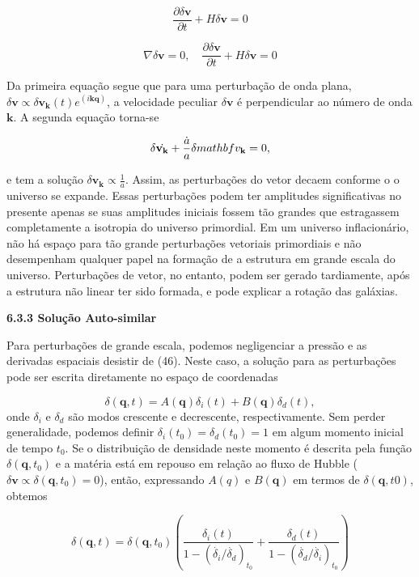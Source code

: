 \documentclass[a4paper,12pt]{article}
\begin{document}
$$\dfrac{\partial\delta\mathbf{v}}{\partial t} + H\delta\mathbf{v} = 0$$
\newline

\begin{equation}
	\nabla\delta\mathbf{v} = 0 , \quad \dfrac{\partial\delta\mathbf{v}}{\partial t } + H\delta\mathbf{v} = 0
\end{equation}

Da primeira equação segue que para uma perturbação de onda plana, $\delta\mathbf{v} \propto \delta\mathbf{v}_\mathbf{k} (t)e^{(i\mathbf{kq})}$, a velocidade peculiar $\delta\mathbf{v}$ é perpendicular ao número de onda $\mathbf{k}$. A segunda equação torna-se

\begin{equation}
	\delta\dot{\mathbf{v}_\mathbf{k}} + \dfrac{\dot{a}}{a}\delta\\mathbf{v}_\mathbf{k}=0,
\end{equation}

e tem a solução $\delta\mathbf{v_k} \propto \frac{1}{a}$. Assim, as perturbações do vetor decaem conforme o
o universo se expande. Essas perturbações podem ter amplitudes significativas no presente
apenas se suas amplitudes iniciais fossem tão grandes que estragassem completamente a isotropia do universo primordial. Em um universo inflacionário, não há espaço para tão grande
perturbações vetoriais primordiais e não desempenham qualquer papel na formação de
a estrutura em grande escala do universo. Perturbações de vetor, no entanto, podem ser
gerado tardiamente, após a estrutura não linear ter sido formada, e pode explicar
a rotação das galáxias.

\begin{center}
	\textbf{6.3.3 Solução Auto-similar}
\end{center}
Para perturbações de grande escala, podemos negligenciar a pressão e as derivadas espaciais
desistir de (46). Neste caso, a solução para as perturbações pode ser escrita diretamente
no espaço de coordenadas

\begin{equation}
	\delta (\mathbf{q},t ) = A(\mathbf{q}) \delta_i (t)+B(\mathbf{q})\delta_d (t),
\end{equation}
onde $\delta_i$ e $\delta_d$ são modos crescente e decrescente, respectivamente. Sem perder
generalidade, podemos definir $\delta_i (t_0) = \delta_d (t_0) = 1$ em algum momento inicial de tempo $t_0$. Se o
distribuição de densidade neste momento é descrita pela função $\delta(\mathbf{q}, t_0)$ e a matéria
está em repouso em relação ao fluxo de Hubble ($\delta\mathbf{v} \propto \delta (\mathbf{q}, t_0) = 0$), então, expressando $A (q)$
e $B (\mathbf{q})$ em termos de $\delta (\mathbf{q}, t0)$, obtemos

\begin{equation}
	\delta (\mathbf{q},t) = \delta (\mathbf{q}, t_0)\left( \dfrac{\delta_i(t)}{1 - (\dot{\delta_i}/\dot{\delta_d})_{t_0}} + \dfrac{\delta_d(t)}{1 - (\dot{\delta_d}/\dot{\delta_i})_{t_0}}\right)
\end{equation}
\end{document}
